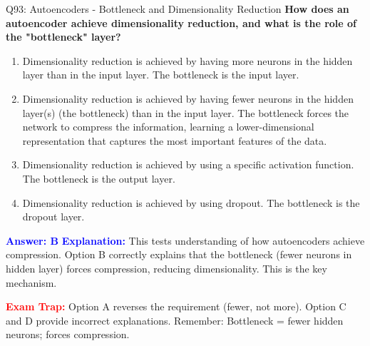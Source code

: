 \documentclass[8pt]{beamer}
\begin{document}
	\begin{frame}{Q93: Autoencoders - Bottleneck and Dimensionality Reduction}
		\fontsize{6.5}{7.5}\selectfont
		\textbf{How does an autoencoder achieve dimensionality reduction, and what is the role of the "bottleneck" layer?}
		
		\begin{enumerate}
			\item Dimensionality reduction is achieved by having more neurons in the hidden layer than in the input layer. The bottleneck is the input layer.
			\item Dimensionality reduction is achieved by having fewer neurons in the hidden layer(s) (the bottleneck) than in the input layer. The bottleneck forces the network to compress the information, learning a lower-dimensional representation that captures the most important features of the data.
			\item Dimensionality reduction is achieved by using a specific activation function. The bottleneck is the output layer.
			\item Dimensionality reduction is achieved by using dropout. The bottleneck is the dropout layer.
		\end{enumerate}
		
		\vspace{0.1cm}
		\textcolor{blue}{\textbf{Answer: B}}
		\vspace{0.1cm}
		\textcolor{blue}{\textbf{Explanation:}} This tests understanding of how autoencoders achieve compression. Option B correctly explains that the bottleneck (fewer neurons in hidden layer) forces compression, reducing dimensionality. This is the key mechanism.
		
		\textcolor{red}{\textbf{Exam Trap:}} Option A reverses the requirement (fewer, not more). Option C and D provide incorrect explanations. Remember: Bottleneck = fewer hidden neurons; forces compression.
	\end{frame}
	
\end{document}
